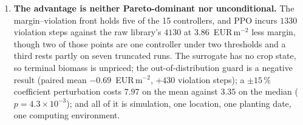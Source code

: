 \begin{enumerate}
\item \textbf{The advantage is neither Pareto-dominant nor unconditional.} The
margin--violation front holds five of the 15 controllers, and PPO
\cite{schulman2017} incurs $1330$ violation steps against the raw library's
$4130$ at $3.86$~EUR\,m$^{-2}$ less margin, though two of those points are
one controller under two thresholds and a third rests partly on seven truncated
runs. The surrogate has no crop state, so terminal biomass is unpriced; the
out-of-distribution guard is a negative result (paired mean
$-0.69$~EUR\,m$^{-2}$, $+430$ violation steps); a $\pm15\,\%$ coefficient
perturbation costs $7.97$ on the mean against $3.35$ on the median
($p=4.3\times10^{-3}$); and all of it is simulation, one location, one planting
date, one computing environment.

\end{enumerate}

